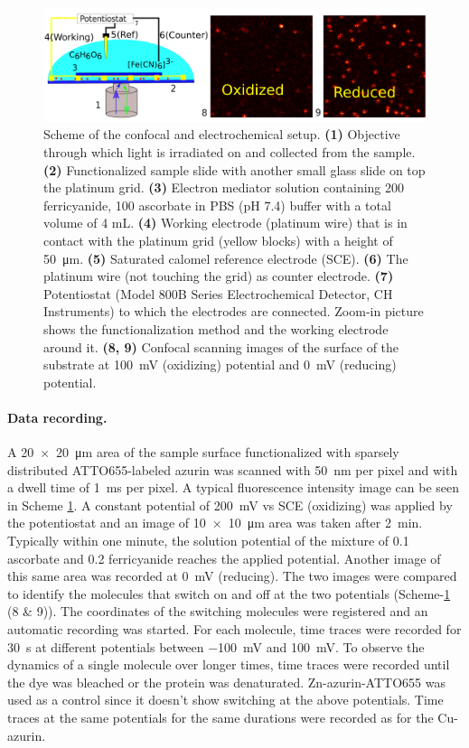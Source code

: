 \documentclass[journal=jacsat,manuscript=article]{achemso}
\begin{document}
\begin{figure}
	\centering
	\includegraphics[width=\textwidth]{Scheme_1_setup}
	\caption{Scheme of the confocal and electrochemical setup.
	\textbf{(1)} Objective through which light is irradiated on and collected from the sample.
	\textbf{(2)} Functionalized sample slide with another small glass slide on top the platinum grid.
	\textbf{(3)} Electron mediator solution containing \SI{200}{\uM} ferricyanide, \SI{100}{\uM} ascorbate in PBS (pH 7.4) buffer with a total volume of 4 mL.
	\textbf{(4)} Working electrode (platinum wire) that is in contact with the platinum grid (yellow blocks) with a height of \SI{50}{\um}.
	\textbf{(5)} Saturated calomel reference electrode (SCE).
	\textbf{(6)} The platinum wire (not touching the grid) as counter electrode.
	\textbf{(7)} Potentiostat (Model 800B Series Electrochemical Detector, CH Instruments) to which the electrodes are connected.
	Zoom-in picture shows the functionalization method and the working electrode around it. 
	\textbf{(8, 9)} Confocal scanning images of the surface of the substrate at \SI{100}{\mV} (oxidizing) potential and \SI{0}{\mV} (reducing) potential.
	}
  	\label{sch:setup}
\end{figure}
\paragraph*{Data recording.}
A \SI[product-units=repeat]{20x20}{\um} area of the sample surface functionalized with sparsely distributed ATTO655-labeled azurin was scanned with \SI{50}{\nm} per pixel and with a dwell time of \SI{1}{\ms} per pixel.
A typical fluorescence intensity image can be seen in Scheme \ref{sch:setup}.
A constant potential of \SI{200}{\mV} vs SCE (oxidizing) was applied by the potentiostat and an image of \SI[product-units=repeat]{10x10}{\um} area was taken after \SI{2}{\minute}.
Typically within one minute, the solution potential of the mixture of \SI{0.1}{\mM} ascorbate and \SI{0.2}{\mM} ferricyanide reaches the applied potential.
Another image of this same area was recorded at \SI{0}{\mV} (reducing).
The two images were compared to identify the molecules that switch on and off at the two potentials (Scheme-\ref{sch:setup} (8 \& 9)).
The coordinates of the switching molecules were registered and an automatic recording was started.
For each molecule, time traces were recorded for \SI{30}{\s} at different potentials between \SI{-100}{\mV} and \SI{100}{\mV}.
To observe the dynamics of a single molecule over longer times, time traces were recorded until the dye was  bleached or the protein was denaturated.
Zn-azurin-ATTO655 was used as a control since it doesn't show switching at the above potentials.
Time traces at the same potentials for the same durations were recorded as for the Cu-azurin.
\end{document}
